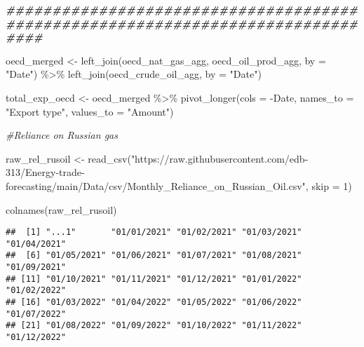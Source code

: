 \documentclass[
]{article}
\newenvironment{Shaded}{\begin{snugshade}}{\end{snugshade}}
\newcommand{\AttributeTok}[1]{\textcolor[rgb]{0.77,0.63,0.00}{#1}}
\newcommand{\CommentTok}[1]{\textcolor[rgb]{0.56,0.35,0.01}{\textit{#1}}}
\newcommand{\DecValTok}[1]{\textcolor[rgb]{0.00,0.00,0.81}{#1}}
\newcommand{\DocumentationTok}[1]{\textcolor[rgb]{0.56,0.35,0.01}{\textbf{\textit{#1}}}}
\newcommand{\FunctionTok}[1]{\textcolor[rgb]{0.00,0.00,0.00}{#1}}
\newcommand{\NormalTok}[1]{#1}
\newcommand{\OtherTok}[1]{\textcolor[rgb]{0.56,0.35,0.01}{#1}}
\newcommand{\SpecialCharTok}[1]{\textcolor[rgb]{0.00,0.00,0.00}{#1}}
\newcommand{\StringTok}[1]{\textcolor[rgb]{0.31,0.60,0.02}{#1}}
\begin{document}
\begin{Shaded}
\begin{Highlighting}[]
\DocumentationTok{\#\#\#\#\#\#\#\#\#\#\#\#\#\#\#\#\#\#\#\#\#\#\#\#\#\#\#\#\#\#\#\#\#\#\#\#\#\#\#\#\#\#\#\#\#\#\#\#\#\#\#\#\#\#\#\#\#\#\#\#\#\#\#\#\#\#\#\#\#\#\#\#\#\#\#\#\#\#\#\#}

\NormalTok{oecd\_merged }\OtherTok{\textless{}{-}} \FunctionTok{left\_join}\NormalTok{(oecd\_nat\_gas\_agg, oecd\_oil\_prod\_agg, }\AttributeTok{by =} \StringTok{"Date"}\NormalTok{) }\SpecialCharTok{\%\textgreater{}\%}
  \FunctionTok{left\_join}\NormalTok{(oecd\_crude\_oil\_agg, }\AttributeTok{by =} \StringTok{"Date"}\NormalTok{)}

\NormalTok{total\_exp\_oecd }\OtherTok{\textless{}{-}}\NormalTok{ oecd\_merged }\SpecialCharTok{\%\textgreater{}\%}
  \FunctionTok{pivot\_longer}\NormalTok{(}\AttributeTok{cols =} \SpecialCharTok{{-}}\NormalTok{Date, }\AttributeTok{names\_to =} \StringTok{"Export type"}\NormalTok{, }\AttributeTok{values\_to =} \StringTok{"Amount"}\NormalTok{)}


\CommentTok{\#Reliance on Russian gas}

\NormalTok{raw\_rel\_rusoil }\OtherTok{\textless{}{-}} \FunctionTok{read\_csv}\NormalTok{(}\StringTok{"https://raw.githubusercontent.com/edb{-}313/Energy{-}trade{-}forecasting/main/Data/csv/Monthly\_Reliance\_on\_Russian\_Oil.csv"}\NormalTok{, }\AttributeTok{skip =} \DecValTok{1}\NormalTok{)}

\FunctionTok{colnames}\NormalTok{(raw\_rel\_rusoil)}
\end{Highlighting}
\end{Shaded}

\begin{verbatim}
##  [1] "...1"       "01/01/2021" "01/02/2021" "01/03/2021" "01/04/2021"
##  [6] "01/05/2021" "01/06/2021" "01/07/2021" "01/08/2021" "01/09/2021"
## [11] "01/10/2021" "01/11/2021" "01/12/2021" "01/01/2022" "01/02/2022"
## [16] "01/03/2022" "01/04/2022" "01/05/2022" "01/06/2022" "01/07/2022"
## [21] "01/08/2022" "01/09/2022" "01/10/2022" "01/11/2022" "01/12/2022"
\end{verbatim}
\end{document}
